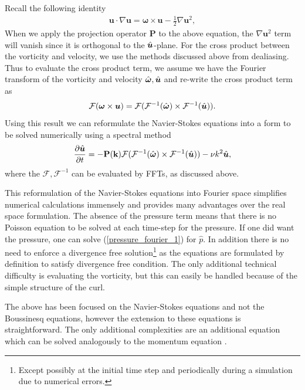 Recall the following identity \cite{kundu,acheson_fluid}
\begin{align}
\bm{u}\cdot\nabla\bm{u} = \bm{\omega}\times \bm{u} - \frac{1}{2}\nabla \bm{u}^{2},
\end{align}
When we apply the projection operator $\textbf{P}$ to the above equation, the $\nabla \bm{u}^{2}$ term will vanish since it is orthogonal to the $\hat{\bm{u}}$-plane. For the cross product between the vorticity and velocity, we use the methods discussed above from dealiasing. Thus to evaluate the cross product term, we assume we have the Fourier transform of the vorticity and velocity $\hat{\bm{\omega}},\hat{\bm{u}}$ and re-write the cross product term as
\begin{align}
\mathcal{F}(\bm{\omega}\times \bm{u}) = \mathcal{F}(\mathcal{F}^{-1}(\hat{\bm{\omega}})\times\mathcal{F}^{-1}(\hat{\bm{u}})).
\end{align}
Using this result we can reformulate the Navier-Stokes equations into a form to be solved numerically using a spectral method
\begin{align}
\frac{\partial \hat{\bm{u}}}{\partial t} = -\textbf{P}(\textbf{k})\mathcal{F}(\mathcal{F}^{-1}(\hat{\bm{\omega}})\times\mathcal{F}^{-1}(\hat{\bm{u}}))-\nu k^{2}\hat{\bm{u}},
\end{align}
where the $\mathcal{F},\mathcal{F}^{-1}$ can be evaluated by FFTs, as discussed above.

This reformulation of the Navier-Stokes equations into Fourier space simplifies numerical calculations immensely and provides many advantages over the real space formulation. The absence of the pressure term means that there is no Poisson equation to be solved at each time-step for the pressure. If one did want the pressure, one can solve (\ref{pressure_fourier_1}) for $\hat{p}$. In addition there is no need to enforce a divergence free solution\footnote{Except possibly at the initial time step and periodically during a simulation due to numerical errors.} as the equations are formulated by definition to satisfy divergence free condition. The only additional technical difficulty is evaluating the vorticity, but this can easily be handled because of the simple structure of the curl. 

The above has been focused on the Navier-Stokes equations and not the Boussinesq equations, however the extension to these equations is straightforward. The only additional complexities are an additional equation which can be solved analogously to the momentum equation \cite{lesieur}.
